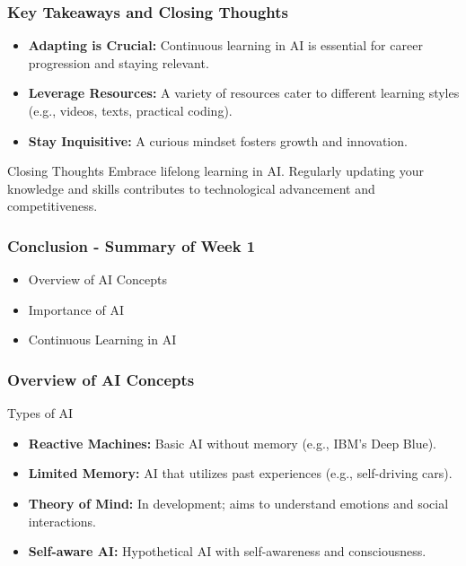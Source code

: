 \documentclass[aspectratio=169]{beamer}
\begin{document}
\begin{frame}[fragile]
    \frametitle{Key Takeaways and Closing Thoughts}
    \begin{itemize}
        \item \textbf{Adapting is Crucial:} Continuous learning in AI is essential for career progression and staying relevant.
        \item \textbf{Leverage Resources:} A variety of resources cater to different learning styles (e.g., videos, texts, practical coding).
        \item \textbf{Stay Inquisitive:} A curious mindset fosters growth and innovation.
    \end{itemize}
    
    \begin{block}{Closing Thoughts}
        Embrace lifelong learning in AI. Regularly updating your knowledge and skills contributes to technological advancement and competitiveness.
    \end{block}
\end{frame}

\begin{frame}[fragile]
    \frametitle{Conclusion - Summary of Week 1}
    \begin{itemize}
        \item Overview of AI Concepts
        \item Importance of AI
        \item Continuous Learning in AI
    \end{itemize}
\end{frame}

\begin{frame}[fragile]
    \frametitle{Overview of AI Concepts}
    \begin{block}{Types of AI}
        \begin{itemize}
            \item \textbf{Reactive Machines:} Basic AI without memory (e.g., IBM’s Deep Blue).
            \item \textbf{Limited Memory:} AI that utilizes past experiences (e.g., self-driving cars).
            \item \textbf{Theory of Mind:} In development; aims to understand emotions and social interactions.
            \item \textbf{Self-aware AI:} Hypothetical AI with self-awareness and consciousness.
        \end{itemize}
    \end{block}
\end{frame}
\end{document}
